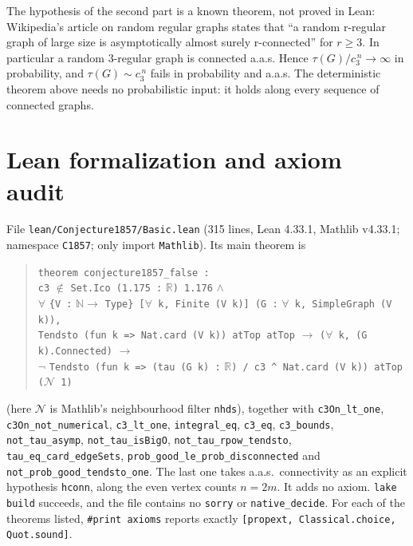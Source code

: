 \documentclass[11pt]{article}
\theoremstyle{definition}
\begin{document}
The hypothesis of the second part is a known theorem, not proved in Lean: Wikipedia's article on
random regular graphs states that ``a random r-regular graph of large size is asymptotically
almost surely r-connected'' for $r\ge3$. In particular a random 3-regular graph is connected
a.a.s. Hence $\tau(G)/c_3^{\,n}\to\infty$ in probability, and $\tau(G)\sim c_3^{\,n}$ fails in
probability and a.a.s. The deterministic theorem above needs no probabilistic input: it holds
along every sequence of connected graphs.

\section{Lean formalization and axiom audit}

File \texttt{lean/Conjecture1857/Basic.lean} (315 lines, Lean 4.33.1, Mathlib v4.33.1; namespace
\texttt{C1857}; only import \texttt{Mathlib}). Its main theorem is
\begin{quote}\small
\texttt{theorem conjecture1857\_false :}\\
\hspace*{1em}\texttt{c3} $\notin$ \texttt{Set.Ico (1.175 :} $\mathbb{R}$\texttt{) 1.176} $\wedge$\\
\hspace*{1em}$\forall$ \texttt{\{V :} $\mathbb{N}\to$ \texttt{Type\} [}$\forall$\texttt{ k, Finite (V k)] (G :} $\forall$\texttt{ k, SimpleGraph (V k)),}\\
\hspace*{2em}\texttt{Tendsto (fun k => Nat.card (V k)) atTop atTop} $\to$ \texttt{(}$\forall$\texttt{ k, (G k).Connected)} $\to$\\
\hspace*{2em}$\neg$ \texttt{Tendsto (fun k => (tau (G k) :} $\mathbb{R}$\texttt{) / c3 \^{} Nat.card (V k)) atTop (}$\mathcal{N}$\texttt{ 1)}
\end{quote}
(here $\mathcal{N}$ is Mathlib's neighbourhood filter \texttt{nhds}), together with \texttt{c3On\_lt\_one}, \texttt{c3On\_not\_numerical}, \texttt{c3\_lt\_one},
\texttt{integral\_eq}, \texttt{c3\_eq}, \texttt{c3\_bounds}, \texttt{not\_tau\_asymp},
\texttt{not\_tau\_isBigO}, \texttt{not\_tau\_rpow\_tendsto}, \texttt{tau\_eq\_card\_edgeSets},
\texttt{prob\_good\_le\_prob\_disconnected} and \texttt{not\_prob\_good\_tendsto\_one}. The last
one takes a.a.s.\ connectivity as an explicit hypothesis \texttt{hconn}, along the even vertex
counts $n=2m$. It adds no axiom. \texttt{lake build} succeeds, and the file contains no
\texttt{sorry} or \texttt{native\_decide}. For each of the theorems listed,
\texttt{\#print axioms} reports exactly \texttt{[propext, Classical.choice, Quot.sound]}.
\end{document}

